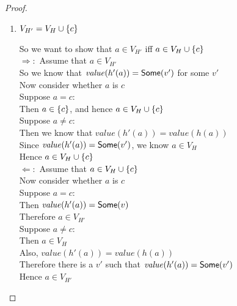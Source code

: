 \begin{proof}
\begin{enumerate}
\item $V_{H'} = V_H \cup \{{c}\}$ 
  \begin{tabbedproof}
    \oo So we want to show that $a \in V_{H'}$ iff $a \in V_H \cup \{{c}\}$ \\
    \oo $\Rightarrow:$ Assume that $a \in V_{H'}$ \\
    \ooo So we know that $\mathit{value}(h'(a)) = \mathsf{Some}(v')$ for some $v'$ \\
    \ooo Now consider whether $a$ is $c$ \\
    \ooo Suppose $a = c$: \\
    \oooo Then $a \in \{{c}\}$, and hence $a \in V_H \cup \{{c}\}$ \\
    \ooo Suppose $a \not= c$: \\
    \oooo Then we know that $\mathit{value}(h'(a)) = \mathit{value}(h(a))$ \\
    \oooo Since $\mathit{value}(h'(a)) = \mathsf{Some}(v')$, we know $a \in V_H$ \\
    \oooo Hence $a \in V_H \cup \{{c}\}$ \\
    \oo $\Leftarrow:$ Assume that $a \in V_H \cup \{{c}\}$ \\
    \ooo Now consider whether $a$ is $c$ \\
    \ooo Suppose $a = c$: \\
    \oooo Then $\mathit{value}(h'(a)) = \mathsf{Some}(v)$ \\
    \oooo Therefore $a \in V_{H'}$ \\
    \ooo Suppose $a \not= c$: \\
    \oooo Then $a \in V_H$ \\
    \oooo Also, $\mathit{value}(h'(a)) = \mathit{value}(h(a))$ \\
    \oooo Therefore there is a $v'$ such that $\mathit{value}(h'(a)) = \mathsf{Some}(v')$ \\
    \oooo Hence $a \in V_{H'}$ \\
  \end{tabbedproof}


\end{enumerate}
\end{proof}
